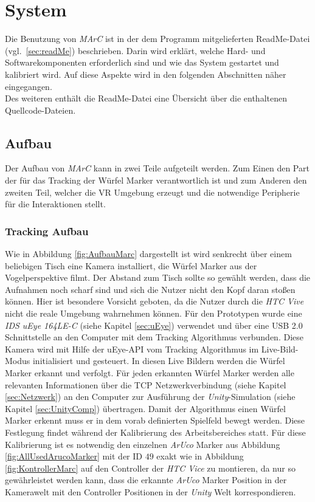 \section{System}
Die Benutzung von \textit{MArC} ist in der dem Programm mitgelieferten ReadMe-Datei (vgl.~\ref{sec:readMe}) beschrieben. Darin wird erklärt, welche Hard- und Softwarekomponenten erforderlich sind und wie das System gestartet und kalibriert wird. Auf diese Aspekte wird in den folgenden Abschnitten näher eingegangen.\\ 
Des weiteren enthält die ReadMe-Datei eine Übersicht über die enthaltenen Quellcode-Dateien.
\subsection{Aufbau}\label{sec:Aufbau}
Der Aufbau von \textit{MArC} kann in zwei Teile aufgeteilt werden. Zum Einen den Part der für das Tracking der Würfel Marker verantwortlich ist und zum Anderen den zweiten Teil, welcher die VR Umgebung erzeugt und die notwendige Peripherie für die Interaktionen stellt.\\
\subsubsection{Tracking Aufbau}
Wie in Abbildung \ref{fig:AufbauMarc} dargestellt ist wird senkrecht über einem beliebigen Tisch eine Kamera installiert, die Würfel Marker aus der Vogelperspektive filmt. Der Abstand zum Tisch sollte so gewählt werden, dass die Aufnahmen noch scharf sind und sich die Nutzer nicht den Kopf daran stoßen können. Hier ist besondere Vorsicht geboten, da die Nutzer durch die \textit{HTC Vive} nicht die reale Umgebung wahrnehmen können. Für den Prototypen wurde eine \textit{IDS uEye 164LE-C} (siehe Kapitel \ref{sec:uEye}) verwendet und über eine USB 2.0 Schnittstelle an den Computer mit dem Tracking Algorithmus verbunden. Diese Kamera wird mit Hilfe der uEye-API vom Tracking Algorithmus im Live-Bild-Modus initialisiert und gesteuert. In diesen Live Bildern werden die Würfel Marker erkannt und verfolgt. Für jeden erkannten Würfel Marker werden alle relevanten Informationen über die TCP Netzwerkverbindung (siehe Kapitel \ref{sec:Netzwerk}) an den Computer zur Ausführung der \textit{Unity}-Simulation (siehe Kapitel \ref{sec:UnityComp}) übertragen. Damit der Algorithmus einen Würfel Marker erkennt muss er in dem vorab definierten Spielfeld bewegt werden. Diese Festlegung findet während der Kalibrierung des Arbeitsbereiches statt. Für diese Kalibrierung ist es notwendig den einzelnen \textit{ArUco} Marker aus Abbildung \ref{fig:AllUsedArucoMarker} mit der ID $49$ exakt wie in Abbildung \ref{fig:KontrollerMarc} auf den Controller der \textit{HTC Vice} zu montieren, da nur so gewährleistet werden kann, dass die erkannte \textit{ArUco} Marker Position in der Kamerawelt mit den Controller Positionen in der \textit{Unity} Welt korrespondieren.

